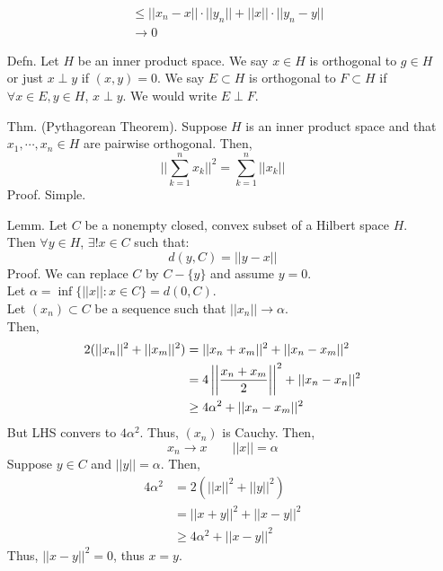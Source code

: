 \documentclass[12pt]{article}
\begin{document}
\begin{itemize}
\begin{align*}
        &\leq ||x_n-x|| \cdot ||y_n|| + ||x|| \cdot ||y_n - y|| \\
        &\to 0
    \end{align*}
    \item[Defn.] Let $H$ be an inner product space. We say $x \in H$ is orthogonal to $g \in H$ or just $x \perp y$ if $(x,y) = 0$. We say $E \subset H$ is orthogonal to $F \subset H$ if $\forall x \in E, y\in H$, $x \perp y$. We would write $E \perp F$. 
    \item[Thm.] (Pythagorean Theorem). Suppose $H$ is an inner product space and that $x_1, \cdots, x_n \in H$ are pairwise orthogonal. Then, 
    \[ ||\sum_{k=1}^n x_k||^2 = \sum_{k=1}^n ||x_k|| \] 
    Proof. Simple. 
    \item[Lemm.] Let $C$ be a nonempty closed, convex subset of a Hilbert space $H$. Then $\forall y \in H$, $\exists ! x \in C$ such that: 
    \[ d(y, C) = ||y-x|| \]
    Proof. We can replace $C$ by $C-\{y\}$ and assume $y = 0$. \\
    Let $\alpha = \inf\{||x|| : x \in C\} = d(0, C)$. \\
    Let $(x_n) \subset C$ be a sequence such that $||x_n|| \to \alpha$. \\
    Then, 
    \begin{align*}
        2(||x_n||^2 + ||x_m||^2) &= ||x_n+x_m||^2 + ||x_n-x_m||^2 \\
        &= 4\left\vert\left\vert\frac{x_n+x_m}{2}\right\vert\right\vert^2 + ||x_n-x_n||^2 \\
        &\geq 4\alpha^2 + ||x_n-x_m||^2
    \end{align*}
    But LHS convers to $4\alpha^2$. Thus, $(x_n)$ is Cauchy. Then, 
    \[ x_n \to x \qquad ||x|| = \alpha\]
    Suppose $y \in C$ and $||y|| = \alpha$. Then,
    \begin{align*}
        4\alpha^2 &= 2(||x||^2 + ||y||^2) \\
        &= ||x+y||^2 + ||x-y||^2 \\
        &\geq 4\alpha^2 + ||x-y||^2 
    \end{align*}
    Thus, $||x-y||^2 = 0$, thus $x = y$.
\end{itemize}
\end{document}
